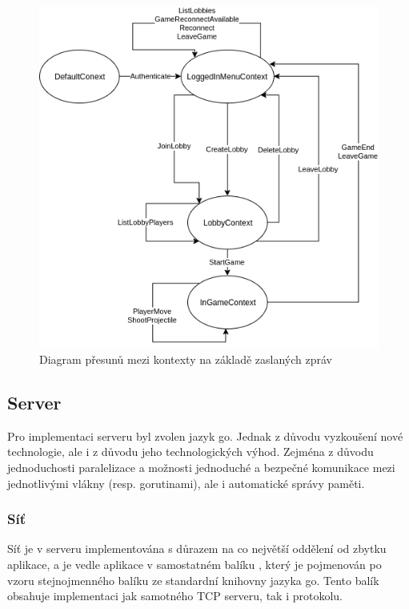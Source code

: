 \documentclass[12pt, a4paper]{article}
\begin{document}
    \begin{figure}[H]
        \centering
        \includegraphics[width=\textwidth]{diagram.png}
        \caption{Diagram přesunů mezi kontexty na základě zaslaných zpráv}
    \end{figure}


    \subsection{Server}
    Pro implementaci serveru byl zvolen jazyk go.
    Jednak z důvodu vyzkoušení nové technologie, ale i z důvodu jeho technologických výhod.
    Zejména z důvodu jednoduchosti paralelizace a možnosti jednoduché a bezpečné komunikace mezi jednotlivými vlákny (resp. gorutinami), ale i automatické správy paměti.

    \subsubsection{Síť}
    Síť je v serveru implementována s důrazem na co největší oddělení od zbytku aplikace, a je vedle aplikace v samostatném balíku , který je pojmenován po vzoru stejnojmenného balíku ze standardní knihovny jazyka go.
    Tento balík obsahuje implementaci jak samotného TCP serveru, tak i protokolu.
    
\end{document}
